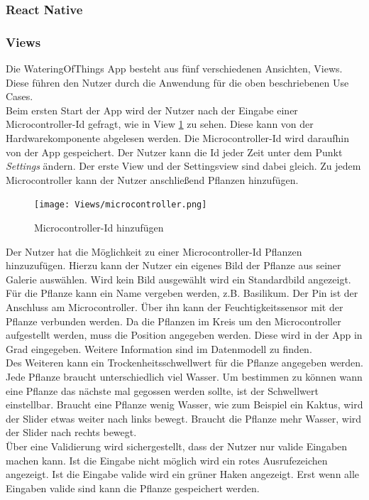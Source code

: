         \subsubsection{React Native}
        \subsubsection{Views}
Die WateringOfThings App besteht aus fünf verschiedenen Ansichten, Views. Diese führen den Nutzer durch die Anwendung für die oben beschriebenen Use Cases. \\

Beim ersten Start der App wird der Nutzer nach der Eingabe einer Microcontroller-Id gefragt, wie in View \ref{microcontroller} zu sehen. Diese kann von der Hardwarekomponente abgelesen werden. Die Microcontroller-Id wird daraufhin von der App gespeichert. Der Nutzer kann die Id jeder Zeit unter dem Punkt \textit{Settings} ändern. Der erste View und der Settingsview sind dabei gleich. Zu jedem Microcontroller kann der Nutzer anschließend Pflanzen hinzufügen.  
\begin{figure}[H]
    \centering
    \texttt{[image: Views/microcontroller.png]}
    \caption{Microcontroller-Id hinzufügen}
    \label{microcontroller}
\end{figure}

Der Nutzer hat die Möglichkeit zu einer Microcontroller-Id Pflanzen hinzuzufügen. Hierzu kann der Nutzer ein eigenes Bild der Pflanze aus seiner Galerie auswählen. Wird kein Bild ausgewählt wird ein Standardbild angezeigt. Für die Pflanze kann ein Name vergeben werden, z.B. Basilikum. Der Pin ist der Anschluss am Microcontroller. Über ihn kann der Feuchtigkeitssensor mit der Pflanze verbunden werden. Da die Pflanzen im Kreis um den Microcontroller aufgestellt werden, muss die Position angegeben werden. Diese wird in der App in Grad eingegeben. Weitere Information sind im Datenmodell zu finden. \\

Des Weiteren kann ein Trockenheitsschwellwert für die Pflanze angegeben werden. Jede Pflanze braucht unterschiedlich viel Wasser. Um bestimmen zu können wann eine Pflanze das nächste mal gegossen werden sollte, ist der Schwellwert einstellbar. Braucht eine Pflanze wenig Wasser, wie zum Beispiel ein Kaktus, wird der Slider etwas weiter nach links bewegt. Braucht die Pflanze mehr Wasser, wird der Slider nach rechts bewegt. \\

Über eine Validierung wird sichergestellt, dass der Nutzer nur valide Eingaben machen kann. Ist die Eingabe nicht möglich wird ein rotes Ausrufezeichen angezeigt. Ist die Eingabe valide wird ein grüner Haken angezeigt. Erst wenn alle Eingaben valide sind kann die Pflanze gespeichert werden. 

